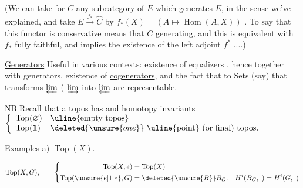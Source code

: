 (We can take for $C$ any subcategory of $E$ which  generates \uline{$E$}, in the sense we've explained, and take $E\xrightarrow{f_*}\widehat C$ by \uline{$f_*(X)=(A\mapsto\operatorname{Hom}(A,X))$} . To say that this functor is conservative means that  $C$  generating, and this  is equivalent with $f_*$ fully faithful, and implies the existence of the left adjoint $f^*$ ....)


\uline{Generators} Useful in various contexts: existence of equalizers ,  hence together with generators, existence of \uline{cogenerators}, and  the fact that   to Sets (say) that transforms $\varprojlim$ ( $\varinjlim$ into $\varprojlim$ are representable.

\uline{NB} Recall that a topos has  and homotopy invariants $\left\{\begin{array}{ll}\operatorname{Top}(\varnothing)&\text{\uline{empty topos}}\\ \operatorname{Top}(\mathbf1)&\deleted{\unsure{one}}\ \text{\uline{point} (or final) topos.}\end{array}\right.$


 \uline{Examples} a) $\operatorname{Top}(X)$. 

\[\operatorname{Top}(X,G),\qquad\left\{\begin{aligned}\operatorname{Top}(X,e)&=\operatorname{Top}(X)\\\operatorname{Top}(\unsure{e|1|*},G)&=\deleted{\unsure{B}}B_G.\quad H^i(B_G,\ )=H^i(G,\ )\end{aligned}\right.\]


